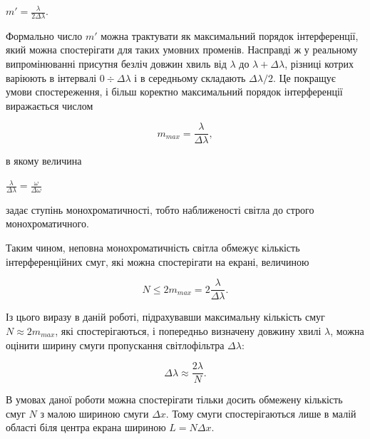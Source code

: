 \documentclass[12pt,a4paper]{article}
\begin{document}
    \begin{center}
        $\displaystyle m' = \frac{\lambda}{2 \Delta \lambda}$.
    \end{center}

    Формально число $m'$ можна трактувати як максимальний порядок інтерференції,
    який можна спостерігати для таких умовних променів. Насправді ж у реальному
    випромінюванні присутня безліч довжин хвиль від $\lambda$ до
    $\lambda + \Delta \lambda$, різниці котрих варіюють в інтервалі
    $0 \div \Delta \lambda$ і в середньому складають $\Delta \lambda / 2$.
    Це покращує умови спостереження, і більш коректно максимальний порядок
    інтерференції виражається числом

    \begin{equation}
        m_{max} = \frac{\lambda}{\Delta \lambda},
        \tag{12}
    \end{equation}

    в якому величина

    \begin{center}
        $\displaystyle \frac{\lambda}{\Delta \lambda} = \frac{\omega}{\Delta \omega}$
    \end{center}

    задає ступінь монохроматичності, тобто наближеності світла до строго монохроматичного.

    Таким чином, неповна монохроматичність світла обмежує кількість інтерференційних смуг,
    які можна спостерігати на екрані, величиною

    \begin{equation}
        N \leq 2m_{max} = 2\frac{\lambda}{\Delta \lambda}.
        \tag{12а}
    \end{equation}

    Із цього виразу в даній роботі, підрахувавши максимальну кількість
    смуг $N \approx 2m_{max}$, які спостерігаються, і попередньо визначену
    довжину хвилі $\lambda$, можна оцінити ширину смуги пропускання світлофільтра $\Delta \lambda$:

    \begin{equation}
        \Delta \lambda \approx \frac{2 \lambda}{N}.
        \tag{13}
    \end{equation}

    В умовах даної роботи можна спостерігати тільки досить обмежену кількість
    смуг $N$ з малою шириною смуги $\Delta x$. Тому смуги спостерігаються лише в
    малій області біля центра екрана шириною $L = N\Delta x$.
\end{document}
